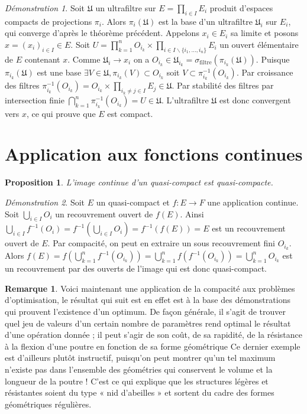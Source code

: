 \documentclass[a4paper, 11pt, french]{book}
\theoremstyle{plain} %
\newtheorem{proposition}{Proposition}
\theoremstyle{definition} %
\newtheorem{remarque}{Remarque}
\theoremstyle{remark} %
\newtheorem*{demonstration}{Démonstration}
\renewcommand{\setminus}{\backslash}
\newcommand{\1}{\mathds{1}}
\newcommand{\inv}[1]{#1^{-1}}
\renewcommand{\frak}[1]{\mathfrak{#1}}
\newcommand{\rm}[1]{\mathrm{#1}}
\begin{document}
\begin{demonstration}
	Soit $\frak{U}$ un ultrafiltre sur $E=\prod_{i\in I}E_i$ produit d'espaces compacts de projections $\pi_i$.
	Alors $\pi_i(\frak{U})$ est la base d'un ultrafiltre $\frak{U}_i$ sur $E_i$, qui converge d'après le théorème précédent.
	Appelons $x_i\in E_i$ sa limite et posons $x=(x_i)_{i\in I}\in E$.
	Soit $U=\prod_{k=1}^nO_{i_k}\times\prod_{i\in I\setminus\{i_1, ..., i_n\}}E_i$ un ouvert élémentaire de $E$ contenant $x$.
	Comme $\frak{U}_i\rightarrow x_i$ on a $O_{i_k}\in\frak{U}_{i_k}=\sigma_\rm{filtre}(\pi_{i_k}(\frak{U}))$.
	Puisque $\pi_{i_k}(\frak{U})$ est une base $\exists V\in\frak{U}, \pi_{i_k}(V)\subset O_{i_k}$ soit $V\subset\inv{\pi_{i_k}}(O_{i_k})$.
	Par croissance des filtres $\inv{\pi_{i_k}}(O_{i_k})=O_{i_k}\times\prod_{i_k\neq j\in I}E_j\in\frak{U}$.
	Par stabilité des filtres par intersection finie $\bigcap_{k=1}^n\inv{\pi_{i_k}}(O_{i_k})=U\in\frak{U}$.
	L’ultrafiltre $\frak{U}$ est donc convergent vers $x$, ce qui prouve que $E$ est compact.
\end{demonstration}

\section{Application aux fonctions continues}

\begin{proposition}
	L’image continue d’un quasi-compact est quasi-compacte.
\end{proposition}

\begin{demonstration}
	Soit $E$ un quasi-compact et $f:E\rightarrow F$ une application continue.
	Soit $\bigcup_{i\in I}O_i$ un recouvrement ouvert de $f(E)$.
	Ainsi $\bigcup_{i\in I}\inv{f}(O_i)=\inv{f}(\bigcup_{i\in I}O_i)=\inv{f}(f(E))=E$ est un recouvrement ouvert de $E$.
	Par compacité, on peut en extraire un sous recouvrement fini $O_{i_k}$.
	Alors $f(E)=f(\bigcup_{k=1}^n\inv{f}(O_{i_k}))=\bigcup_{k=1}^nf(\inv{f}(O_{i_k}))=\bigcup_{k=1}^nO_{i_k}$ est un recouvrement par des ouverts de l'image qui est donc quasi-compact.
\end{demonstration}

\begin{remarque}
	Voici maintenant une application de la compacité aux problèmes d’optimisation, le résultat qui suit est en effet est à la base des démonstrations qui prouvent l’existence d’un optimum.
	De façon générale, il s’agit de trouver quel jeu de valeurs d’un certain nombre de paramètres rend optimal le résultat d’une opération donnée ; il peut s’agir de son coût, de sa rapidité, de la résistance à la flexion d’une poutre en fonction de sa forme géométrique Ce dernier exemple est d’ailleurs plutôt instructif, puisqu’on peut montrer qu’un tel maximum n’existe pas dans l’ensemble des géométries qui conservent le volume et la longueur de la poutre !
	C’est ce qui explique que les structures légères et résistantes soient du type « nid d’abeilles » et sortent du cadre des formes géométriques régulières.
\end{remarque}
\end{document}
